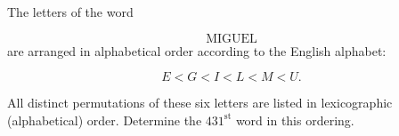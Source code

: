 The letters of the word

\[
\text{MIGUEL}
\]are arranged in alphabetical order according to the English alphabet:

\[
E<G<I<L<M<U.
\]

All distinct permutations of these six letters are listed in lexicographic (alphabetical) order. Determine the \(431^\text{st}\) word in this ordering.
